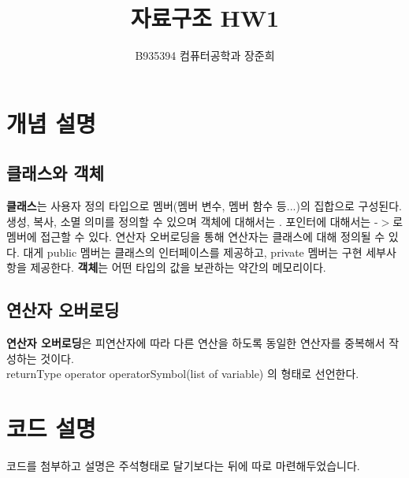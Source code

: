 \documentclass[a4paper]{article}
\begin{document}
\title{자료구조 HW1}
\author{B935394 컴퓨터공학과 장준희}
\maketitle
\newpage
\section{개념 설명}
\subsection{클래스와 객체}
\textbf{클래스}는 사용자 정의 타입으로 멤버(멤버 변수, 멤버 함수 등...)의 집합으로 구성된다. 생성, 복사, 소멸 의미를 정의할 수 있으며 객체에 대해서는 . 포인터에 대해서는 -$>$로 멤버에 접근할 수 있다. 연산자 오버로딩을 통해 연산자는 클래스에 대해 정의될 수 있다. 대게 public 멤버는 클래스의 인터페이스를 제공하고, private 멤버는 구현 세부사항을 제공한다. \textbf{객체}는 어떤 타입의 값을 보관하는 약간의 메모리이다. 
\subsection{연산자 오버로딩}
\textbf{연산자 오버로딩}은 피연산자에 따라 다른 연산을 하도록 동일한 연산자를 중복해서 작성하는 것이다.\\ 
returnType operator operatorSymbol(list of variable) 의 형태로 선언한다.

\section{코드 설명}
코드를 첨부하고 설명은 주석형태로 달기보다는 뒤에 따로 마련해두었습니다.
\end{document}
